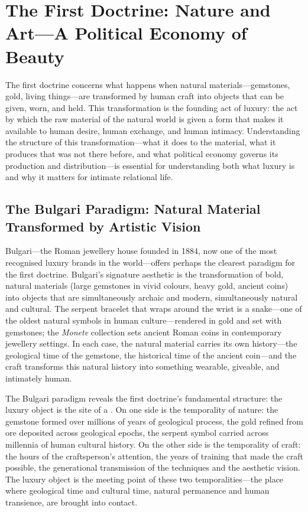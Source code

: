 \section{The First Doctrine: Nature and Art---A Political Economy of Beauty}
\label{p16:sec:nature_art}

\noindent
The first doctrine concerns what happens when natural materials---gemstones, gold, living things---are transformed by human craft into objects that can be given, worn, and held. This transformation is the founding act of luxury: the act by which the raw material of the natural world is given a form that makes it available to human desire, human exchange, and human intimacy. Understanding the structure of this transformation---what it does to the material, what it produces that was not there before, and what political economy governs its production and distribution---is essential for understanding both what luxury is and why it matters for intimate relational life.

\subsection{The Bulgari Paradigm: Natural Material Transformed by Artistic Vision}
\label{p16:subsec:bulgari}

\noindent
Bulgari---the Roman jewellery house founded in 1884, now one of the most recognised luxury brands in the world---offers perhaps the clearest paradigm for the first doctrine. Bulgari's signature aesthetic is the transformation of bold, natural materials (large gemstones in vivid colours, heavy gold, ancient coins) into objects that are simultaneously archaic and modern, simultaneously natural and cultural. The serpent bracelet that wraps around the wrist is a snake---one of the oldest natural symbols in human culture---rendered in gold and set with gemstones; the \emph{Monete} collection sets ancient Roman coins in contemporary jewellery settings. In each case, the natural material carries its own history---the geological time of the gemstone, the historical time of the ancient coin---and the craft transforms this natural history into something wearable, giveable, and intimately human.

The Bulgari paradigm reveals the first doctrine's fundamental structure: the luxury object is the site of a . On one side is the temporality of nature: the gemstone formed over millions of years of geological process, the gold refined from ore deposited across geological epochs, the serpent symbol carried across millennia of human cultural history. On the other side is the temporality of craft: the hours of the craftsperson's attention, the years of training that made the craft possible, the generational transmission of the techniques and the aesthetic vision. The luxury object is the meeting point of these two temporalities---the place where geological time and cultural time, natural permanence and human transience, are brought into contact.

